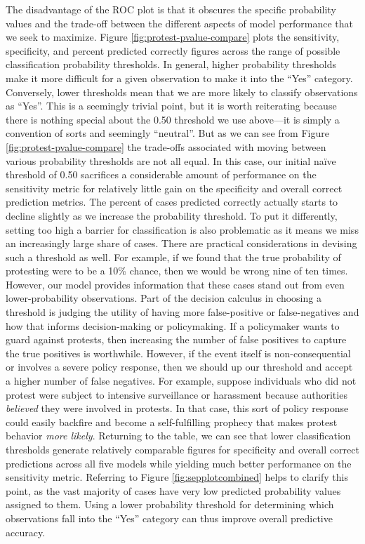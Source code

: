 			The disadvantage of the ROC plot is that it obscures the specific probability values and the trade-off between the different aspects of model performance that we seek to maximize. Figure \ref{fig:protest-pvalue-compare} plots the sensitivity, specificity, and percent predicted correctly figures across the range of possible classification probability thresholds. In general, higher probability thresholds make it more difficult for a given observation to make it into the ``Yes'' category. Conversely, lower thresholds mean that we are more likely to classify observations as ``Yes''. This is a seemingly trivial point, but it is worth reiterating because there is nothing special about the 0.50 threshold we use above---it is simply a convention of sorts and seemingly ``neutral''. But as we can see from Figure \ref{fig:protest-pvalue-compare} the trade-offs associated with moving between various probability thresholds are not all equal. In this case, our initial na\"{i}ve threshold of 0.50 sacrifices a considerable amount of performance on the sensitivity metric for relatively little gain on the specificity and overall correct prediction metrics. The percent of cases predicted correctly actually starts to decline slightly as we increase the probability threshold.
			To put it differently, setting too high a barrier for classification is also problematic as it means we miss an increasingly large share of cases. There are practical considerations in devising such a threshold as well. For example, if we found that the true probability of protesting were to be a 10\% chance, then we would be wrong nine of ten times. However, our model provides information that these cases stand out from even lower-probability observations. Part of the decision calculus in choosing a threshold is judging the utility of having more false-positive or false-negatives and how that informs decision-making or policymaking. If a policymaker wants to guard against protests, then increasing the number of false positives to capture the true positives is worthwhile. However, if the event itself is non-consequential or involves a severe policy response, then we should up our threshold and accept a higher number of false negatives. For example, suppose individuals who did not protest were subject to intensive surveillance or harassment because authorities \textit{believed} they were involved in protests. In that case, this sort of policy response could easily backfire and become a self-fulfilling prophecy that makes protest behavior \textit{more likely}. Returning to the table, we can see that lower classification thresholds generate relatively comparable figures for specificity and overall correct predictions across all five models while yielding much better performance on the sensitivity metric. Referring to Figure \ref{fig:sepplotcombined} helps to clarify this point, as the vast majority of cases have very low predicted probability values assigned to them. Using a lower probability threshold for determining which observations fall into the ``Yes'' category can thus improve overall predictive accuracy.
			
